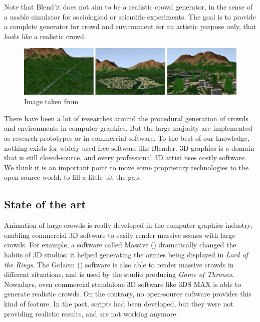 Note that Blend'it does not aim to be a realistic crowd generator, in
the sense of a usable simulator for sociological or scientific
experiments. The goal is to provide a complete generator for crowd and
environment for an artistic purpose only, that \textit{looks like} a
realistic crowd.

\begin{figure}[h]
  \includegraphics[width=15cm]{img/env1.jpg}
  \caption{Image taken from \cite{DeclarativeArchitecture}}
  \label{fig:env}
\end{figure}


There have been a lot of researches around the procedural generation
of crowds and environments in computer graphics. But the large
majority are implemented as research prototypes or in commercial
software. To the best of our knowledge, nothing exists for widely used
free software like Blender. 3D graphics is a domain that is still
closed-source, and every professional 3D artist uses costly
software. We think it is an important point to move some proprietary
technologies to the open-source world, to fill a little bit the gap.

\subsection{State of the art}


Animation of large crowds is really developed in the computer
graphics industry, enabling commercial 3D software to easily render
massive scenes with large crowds. For example, a software called Massive (\cite{Massive}) dramatically
changed the habits of 3D studios: it helped generating
the armies being displayed in \textit{Lord of the Rings}. The Golaem
(\cite{Golaem}) software is also able to render massive crowds in
different situations, and is used by the studio producing \textit{Game
of Thrones}. Nowadays, even commercial standalone 3D software like 3DS
MAX\cite{3dsmax} is able to generate realistic crowds. On the
contrary, no open-source software provides this kind of feature. In
the past, scripts had been developed, but they were not providing
realistic results, and are not working anymore.


